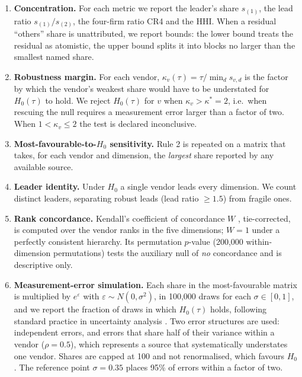\documentclass[11pt]{article}
\newcommand{\Hzero}{H_{0}}
\begin{document}
\begin{enumerate}
\item \textbf{Concentration.} For each metric we report the leader's share $s_{(1)}$, the lead ratio $s_{(1)}/s_{(2)}$, the four-firm ratio CR4 and the HHI. When a residual ``others'' share is unattributed, we report bounds: the lower bound treats the residual as atomistic, the upper bound splits it into blocks no larger than the smallest named share.
\item \textbf{Robustness margin.} For each vendor, $\kappa_v(\tau)=\tau/\min_d s_{v,d}$ is the factor by which the vendor's weakest share would have to be understated for $\Hzero(\tau)$ to hold. We reject $\Hzero(\tau)$ for $v$ when $\kappa_v>\kappa^{*}=2$, i.e.\ when rescuing the null requires a measurement error larger than a factor of two. When $1<\kappa_v\le 2$ the test is declared inconclusive.
\item \textbf{Most-favourable-to-$\Hzero$ sensitivity.} Rule 2 is repeated on a matrix that takes, for each vendor and dimension, the \emph{largest} share reported by any available source.
\item \textbf{Leader identity.} Under $\Hzero$ a single vendor leads every dimension. We count distinct leaders, separating robust leads (lead ratio $\ge1.5$) from fragile ones.
\item \textbf{Rank concordance.} Kendall's coefficient of concordance $W$ \cite{kendall1939problem}, tie-corrected, is computed over the vendor ranks in the five dimensions; $W=1$ under a perfectly consistent hierarchy. Its permutation $p$-value (200{,}000 within-dimension permutations) tests the auxiliary null of \emph{no} concordance and is descriptive only.
\item \textbf{Measurement-error simulation.} Each share in the most-favourable matrix is multiplied by $e^{\varepsilon}$ with $\varepsilon\sim N(0,\sigma^{2})$, in 100{,}000 draws for each $\sigma\in[0,1]$, and we report the fraction of draws in which $\Hzero(\tau)$ holds, following standard practice in uncertainty analysis \cite{saltelli2008global}. Two error structures are used: independent errors, and errors that share half of their variance within a vendor ($\rho=0.5$), which represents a source that systematically understates one vendor. Shares are capped at 100 and not renormalised, which favours $\Hzero$. The reference point $\sigma=0.35$ places 95\% of errors within a factor of two.

\end{enumerate}
\end{document}
